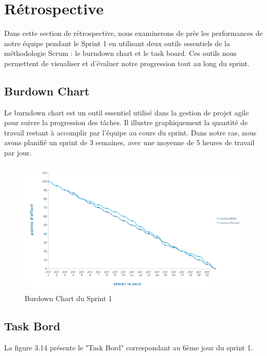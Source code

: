 \section{Rétrospective}
Dans cette section de rétrospective, nous examinerons de près les performances de notre équipe pendant le Sprint 1 en utilisant deux outils essentiels de la méthodologie Scrum : le burndown chart et le task board. Ces outils nous permettent de visualiser et d'évaluer notre progression tout au long du sprint.

\subsection{Burdown Chart}
Le burndown chart est un outil essentiel utilisé dans la gestion de projet agile pour suivre la progression des tâches. Il illustre graphiquement la quantité de travail restant à accomplir par l'équipe au cours du sprint. Dans notre cas, nous avons planifié un sprint de 3 semaines, avec une moyenne de 5 heures de travail par jour.

\begin{figure}[ht!]
  \centering
  \includegraphics[width=1\textwidth, height=6.5cm]{chap3.images/burndown chart sprint 1.png}
  \caption{ Burdown Chart du Sprint 1}

\end{figure}

\newpage
\subsection{Task Bord}

La figure 3.14 présente le "Task Bord" correspondant au 6ème jour du sprint 1.

